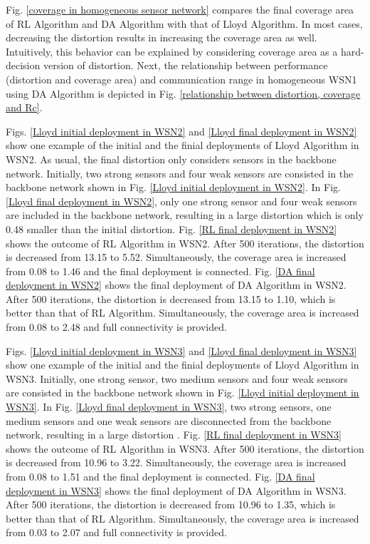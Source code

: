 \documentclass[journal,draftcls,onecolumn,12pt,twoside, narroweqnarray]{IEEEtran}
\begin{document}
Fig. \ref{coverage in homogeneous sensor network} compares the final coverage area of RL Algorithm and DA Algorithm with that of Lloyd Algorithm. In most cases, decreasing the distortion results in increasing the coverage area as well. Intuitively, this behavior can be explained by considering coverage area as a hard-decision version of distortion. Next, the relationship between performance (distortion and coverage area) and communication range  in homogeneous WSN1 using DA Algorithm is depicted in Fig. \ref{relationship between distortion, coverage and Rc}.

Figs. \ref{Lloyd initial deployment in WSN2} and \ref{Lloyd final deployment in WSN2} show one example of the initial and the finial deployments of Lloyd Algorithm in WSN2.
As usual, the final distortion only considers sensors in the backbone network.
Initially, two strong sensors and four weak sensors are consisted in the backbone network shown in Fig. \ref{Lloyd initial deployment in WSN2}. In Fig. \ref{Lloyd final deployment in WSN2}, only one strong sensor and four weak sensors are included in the backbone network, resulting in a large distortion  which is only 0.48 smaller than the initial distortion.
Fig. \ref{RL final deployment in WSN2} shows the outcome of RL Algorithm in WSN2. After 500 iterations, the distortion is decreased from 13.15 to 5.52. Simultaneously, the coverage area is increased from 0.08 to 1.46 and the final deployment is connected.
Fig. \ref{DA final deployment in WSN2} shows the final deployment of DA Algorithm in WSN2. After 500 iterations, the distortion is decreased from 13.15 to 1.10, which is better than that of RL Algorithm. Simultaneously, the coverage area is increased from 0.08 to 2.48 and full connectivity is provided.

Figs. \ref{Lloyd initial deployment in WSN3} and \ref{Lloyd final deployment in WSN3} show one example of the initial and the finial deployments of Lloyd Algorithm in WSN3.
Initially, one strong sensor, two medium sensors and four weak sensors are consisted in the backbone network shown in Fig. \ref{Lloyd initial deployment in WSN3}. In Fig. \ref{Lloyd final deployment in WSN3}, two strong sensors, one medium sensors and one weak sensors are disconnected from the backbone network, resulting in a large distortion .
Fig. \ref{RL final deployment in WSN3} shows the outcome of RL Algorithm in WSN3. After 500 iterations, the distortion is decreased from 10.96 to 3.22. Simultaneously, the coverage area is increased from 0.08 to 1.51 and the final deployment is connected.
Fig. \ref{DA final deployment in WSN3} shows the final deployment of DA Algorithm in WSN3. After 500 iterations, the distortion is decreased from 10.96 to 1.35, which is better than that of RL Algorithm. Simultaneously, the coverage area is increased from 0.03 to 2.07 and full connectivity is provided.
\end{document}
